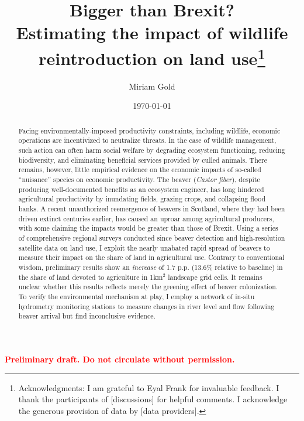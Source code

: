 \documentclass[11pt, english, letterpaper]{article}
\begin{document}
\justifying


\vspace{-2em} 

\title{Bigger than Brexit? \\ Estimating the impact of wildlife reintroduction on land use\thanks{Acknowledgments: I am grateful to Eyal Frank for invaluable feedback. I thank the participants of [discussions] for helpful comments. I acknowledge the generous provision of data by [data providers].}}

\author[1]{\small Miriam Gold}

\date{\today}
\maketitle

\begin{center}
\vspace{-3em}
\textbf{\textcolor{red}{Preliminary draft. Do not circulate without permission.}}
\end{center}

\begin{abstract}
    \singlespacing 
    Facing environmentally-imposed productivity constraints, including wildlife, economic operations are incentivized to neutralize threats. In the case of wildlife management, such action can often harm social welfare by degrading ecosystem functioning, reducing biodiversity, and eliminating beneficial services provided by culled animals. There remains, however, little empirical evidence on the economic impacts of so-called ``nuisance'' species on economic productivity. The beaver (\textit{Castor fiber}), despite producing well-documented benefits as an ecosystem engineer, has long hindered agricultural productivity by inundating fields, grazing crops, and collapsing flood banks. A recent unauthorized reemergence of beavers in Scotland, where they had been driven extinct centuries earlier, has caused an uproar among agricultural producers, with some claiming the impacts would be greater than those of Brexit. Using a series of comprehensive regional surveys conducted since beaver detection and high-resolution satellite data on land use, I exploit the nearly unabated rapid spread of beavers to measure their impact on the share of land in agricultural use. Contrary to conventional wisdom, preliminary results show an \textit{increase} of 1.7 p.p. (13.6\% relative to baseline) in the share of land devoted to agriculture in 1km$^2$ landscape grid cells. It remains unclear whether this results reflects merely the greening effect of beaver colonization. To verify the environmental mechanism at play, I employ a network of in-situ hydrometry monitoring stations to measure changes in river level and flow following beaver arrival but find inconclusive evidence.
\end{abstract}
\end{document}
